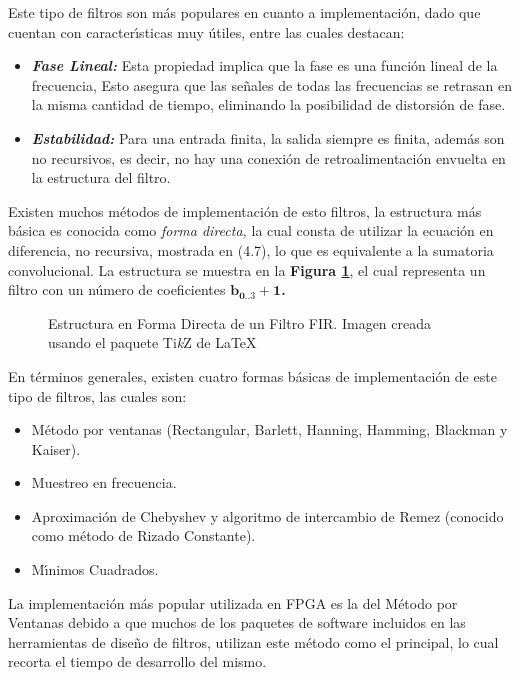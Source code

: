 Este tipo de filtros son m\'{a}s populares en cuanto a implementaci\'{o}n,
dado que cuentan con caracter\'{\i}sticas muy \'{u}tiles, entre las
cuales destacan:
\begin{itemize}
\item \textbf{\emph{Fase Lineal: }}Esta propiedad implica que la fase es
una funci\'{o}n lineal de la frecuencia, Esto asegura que las se\~{n}ales
de todas las frecuencias se retrasan en la misma cantidad de tiempo,
eliminando la posibilidad de distorsi\'{o}n de fase.
\item \textbf{\emph{Estabilidad:}} Para una entrada finita, la salida siempre
es finita, adem\'{a}s son no recursivos, es decir, no hay una conexi\'{o}n
de retroalimentaci\'{o}n envuelta en la estructura del filtro.
\end{itemize}
Existen muchos m\'{e}todos de implementaci\'{o}n de esto filtros,
la estructura m\'{a}s b\'{a}sica es conocida como \emph{forma directa,
}la cual consta de utilizar la ecuaci\'{o}n en diferencia, no recursiva,
mostrada en (4.7)\cite{fir_complete}, lo que es equivalente a la
sumatoria convolucional. La estructura se muestra en la \textbf{Figura
\ref{fig:Estructura-en-Forma}}, el cual representa un filtro con
un n\'{u}mero de coeficientes $\mathbf{b_{0..3}+1}$\textbf{.}

\begin{figure}[H]
\begin{centering}

\par\end{centering}
\caption{Estructura en Forma Directa de un Filtro FIR\label{fig:Estructura-en-Forma}.
Imagen creada usando el paquete \textup{Ti\textit{k}Z} de \LaTeX }
\end{figure}

En t\'{e}rminos generales, existen cuatro formas b\'{a}sicas de implementaci\'{o}n
de este tipo de filtros, las cuales son:
\begin{itemize}
\item M\'{e}todo por ventanas (Rectangular, Barlett, Hanning, Hamming, Blackman
y Kaiser).
\item Muestreo en frecuencia.
\item Aproximaci\'{o}n de Chebyshev y algoritmo de intercambio de Remez
(conocido como m\'{e}todo de Rizado Constante).
\item M\'{\i}nimos Cuadrados.
\end{itemize}
La implementaci\'{o}n m\'{a}s popular utilizada en FPGA es la del
M\'{e}todo por Ventanas debido a que muchos de los paquetes de software
incluidos en las herramientas de dise\~{n}o de filtros, utilizan este
m\'{e}todo como el principal, lo cual recorta el tiempo de desarrollo
del mismo. 

